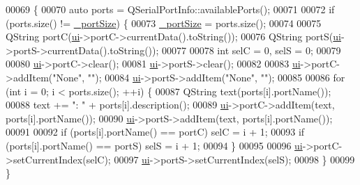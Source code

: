 \begin{DoxyCode}
00069 \{
00070     \textcolor{keyword}{auto} ports = QSerialPortInfo::availablePorts();
00071     
00072     \textcolor{keywordflow}{if} (ports.size() != \hyperlink{class_options_window_a9bd4dccc7a544b1db78dc8cf330b88f6}{\_portSize}) \{
00073         \hyperlink{class_options_window_a9bd4dccc7a544b1db78dc8cf330b88f6}{\_portSize} = ports.size();
00074         
00075         QString portC(\hyperlink{class_options_window_a8347442d5b3b670e8fff0c4102db1f88}{ui}->portC->currentData().toString());
00076         QString portS(\hyperlink{class_options_window_a8347442d5b3b670e8fff0c4102db1f88}{ui}->portS->currentData().toString());
00077         
00078         \textcolor{keywordtype}{int} selC = 0, selS = 0;
00079         
00080         \hyperlink{class_options_window_a8347442d5b3b670e8fff0c4102db1f88}{ui}->portC->clear();
00081         \hyperlink{class_options_window_a8347442d5b3b670e8fff0c4102db1f88}{ui}->portS->clear();
00082         
00083         \hyperlink{class_options_window_a8347442d5b3b670e8fff0c4102db1f88}{ui}->portC->addItem(\textcolor{stringliteral}{"None"}, \textcolor{stringliteral}{""});
00084         \hyperlink{class_options_window_a8347442d5b3b670e8fff0c4102db1f88}{ui}->portS->addItem(\textcolor{stringliteral}{"None"}, \textcolor{stringliteral}{""});
00085         
00086         \textcolor{keywordflow}{for} (\textcolor{keywordtype}{int} i = 0; i < ports.size(); ++i) \{
00087             QString text(ports[i].portName());
00088             text += \textcolor{stringliteral}{": "} + ports[i].description();
00089             \hyperlink{class_options_window_a8347442d5b3b670e8fff0c4102db1f88}{ui}->portC->addItem(text, ports[i].portName());
00090             \hyperlink{class_options_window_a8347442d5b3b670e8fff0c4102db1f88}{ui}->portS->addItem(text, ports[i].portName());
00091             
00092             \textcolor{keywordflow}{if} (ports[i].portName() == portC) selC = i + 1;
00093             \textcolor{keywordflow}{if} (ports[i].portName() == portS) selS = i + 1;
00094         \}
00095 
00096         \hyperlink{class_options_window_a8347442d5b3b670e8fff0c4102db1f88}{ui}->portC->setCurrentIndex(selC);
00097         \hyperlink{class_options_window_a8347442d5b3b670e8fff0c4102db1f88}{ui}->portS->setCurrentIndex(selS);
00098     \}
00099 \}
\end{DoxyCode}
\hypertarget{class_options_window_ae8c0373be58da710194f8d14f1c3c4dc}{}
